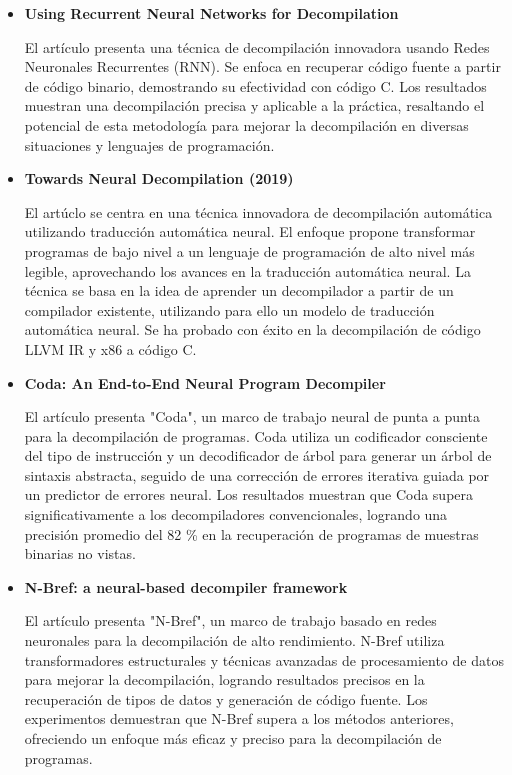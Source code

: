 \begin{itemize}
\item \textbf{Using Recurrent Neural Networks for Decompilation} \cite{8330222}

    El artículo presenta una técnica de decompilación innovadora usando Redes
    Neuronales Recurrentes (RNN). Se enfoca en recuperar código fuente a partir
    de código binario, demostrando su efectividad con código C. Los resultados
    muestran una decompilación precisa y aplicable a la práctica, resaltando el
    potencial de esta metodología para mejorar la decompilación en diversas
    situaciones y lenguajes de programación.

\item \textbf{Towards Neural Decompilation (2019)} \cite{KatzOmer2019TND}

    El artúclo se centra en una técnica innovadora de decompilación automática
    utilizando traducción automática neural. El enfoque propone transformar
    programas de bajo nivel a un lenguaje de programación de alto nivel más legible,
    aprovechando los avances en la traducción automática neural. La técnica se basa
    en la idea de aprender un decompilador a partir de un compilador existente, utilizando
    para ello un modelo de traducción automática neural. Se ha probado con éxito en la
    decompilación de código LLVM IR y x86 a código C.

\item \textbf{Coda: An End-to-End Neural Program Decompiler} \cite{FuCheng2019ANPD}

    El artículo presenta "Coda", un marco de trabajo neural de punta a punta para la
    decompilación de programas. Coda utiliza un codificador consciente del tipo de
    instrucción y un decodificador de árbol para generar un árbol de sintaxis abstracta,
    seguido de una corrección de errores iterativa guiada por un predictor de errores neural.
    Los resultados muestran que Coda supera significativamente a los decompiladores convencionales,
    logrando una precisión promedio del 82 \% en la recuperación de programas de muestras binarias
    no vistas.

\item \textbf{N-Bref: a neural-based decompiler framework} \cite{fu2021nbref}

    El artículo presenta "N-Bref", un marco de trabajo basado en redes neuronales para la
    decompilación de alto rendimiento. N-Bref utiliza transformadores estructurales y
    técnicas avanzadas de procesamiento de datos para mejorar la decompilación, logrando
    resultados precisos en la recuperación de tipos de datos y generación de código fuente.
    Los experimentos demuestran que N-Bref supera a los métodos anteriores, ofreciendo un
    enfoque más eficaz y preciso para la decompilación de programas.


\end{itemize}
